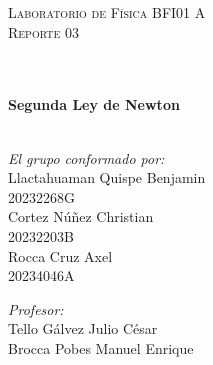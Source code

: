 \documentclass[10pt]{article}
\begin{document}
\begin{center}
\begin{minipage}{0.9\textwidth} 
\begin{center}																					%
\textsc{\LARGE  Laboratorio de Física BFI01 A\\[0.7cm] Reporte 03}
\end{center}
\end{minipage}\\[0.3cm]
 			\vspace*{0.4cm}																		%
\HRule \\[0.5cm]																	%
{ \huge \bfseries Segunda Ley de Newton}\\[0.2cm]	%
\HRule \\[0.9cm]																	%
\begin{minipage}{0.46\textwidth}													%
\begin{flushleft} \large															%

\emph{El grupo conformado por:}\\[2mm]
Llactahuaman Quispe Benjamin\\20232268G \\[1mm]
Cortez Núñez Christian\\20232203B\\[1mm]
Rocca Cruz Axel\\20234046A\\[1mm]
 

\end{flushleft}																		%
\end{minipage}		
\begin{minipage}{0.52\textwidth}		
\vspace{-1.9cm}											%
\begin{flushright} \large															%
\emph{Profesor:}\\[2mm]																	%
Tello Gálvez Julio César\\[1mm]Brocca Pobes Manuel Enrique\\
\end{flushright}																	%
\end{minipage}	
\vspace*{1cm}
 	

\end{center}
\end{document}
